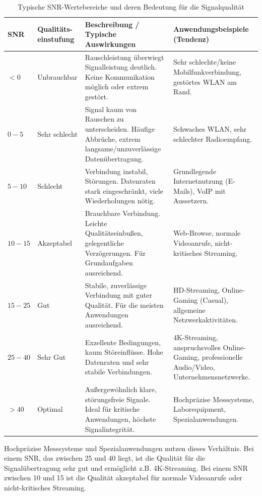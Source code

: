 \documentclass{scrartcl}
\numberwithin{equation}{section}
\begin{document}
\begin{table}[h!]
	\centering
	\caption{Typische SNR-Wertebereiche und deren Bedeutung für die Signalqualität}
	\label{tab:snr}
	\begin{tabular}{p{2cm}|p{2.5cm}|p{5cm}|p{4cm}}
		\hline
		SNR & Qualitäts-einstufung & Beschreibung / Typische Auswirkungen & Anwendungsbeispiele (Tendenz) \\
		\hline\hline
		$< 0$            & Unbrauchbar & Rauschleistung überwiegt Signalleistung deutlich. Keine Kommunikation möglich oder extrem gestört. & Sehr schlechte/keine Mobilfunkverbindung, gestörtes WLAN am Rand. \\
		\hline
		$0 - 5$          & Sehr schlecht & Signal kaum von Rauschen zu unterscheiden. Häufige Abbrüche, extrem langsame/unzuverlässige Datenübertragung. & Schwaches WLAN, sehr schlechter Radioempfang. \\
		\hline
		$5 - 10$         & Schlecht & Verbindung instabil, Störungen. Datenraten stark eingeschränkt, viele Wiederholungen nötig. & Grundlegende Internetnutzung (E-Mails), VoIP mit Aussetzern. \\
		\hline
		$10 - 15$        & Akzeptabel & Brauchbare Verbindung. Leichte Qualitätseinbußen, gelegentliche Verzögerungen. Für Grundaufgaben ausreichend. & Web-Browse, normale Videoanrufe, nicht-kritisches Streaming. \\
		\hline
		$15 - 25$        & Gut & Stabile, zuverlässige Verbindung mit guter Qualität. Für die meisten Anwendungen ausreichend. & HD-Streaming, Online-Gaming (Casual), allgemeine Netzwerkaktivitäten. \\
		\hline
		$25 - 40$        & Sehr Gut & Exzellente Bedingungen, kaum Störeinflüsse. Hohe Datenraten und sehr stabile Verbindungen. & 4K-Streaming, anspruchsvolles Online-Gaming, professionelle Audio/Video, Unternehmensnetzwerke. \\
		\hline
		$> 40$           & Optimal & Außergewöhnlich klare, störungsfreie Signale. Ideal für kritische Anwendungen, höchste Signalintegrität. & Hochpräzise Messsysteme, Laborequipment, Spezialanwendungen. \\
		\hline
	\end{tabular}
\end{table}
Hochpräzise Messsysteme und Spezialanwendungen nutzen dieses Verhältnis. Bei einem SNR, das zwischen 25 und 40 liegt, ist die Qualität für die Signalübertragung sehr gut und ermöglicht z.B. 4K-Streaming. Bei einem SNR zwischen 10 und 15 ist die Qualität akzeptabel für normale Videoanrufe oder nicht-kritisches Streaming.
\end{document}
